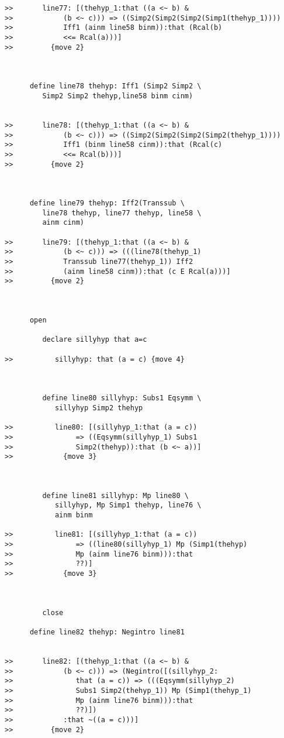 \documentclass[12pt]{article}
\begin{document}
\begin{verbatim}
>>       line77: [(thehyp_1:that ((a <~ b) &
>>            (b <~ c))) => ((Simp2(Simp2(Simp2(Simp1(thehyp_1))))
>>            Iff1 (ainm line58 binm)):that (Rcal(b)
>>            <<= Rcal(a)))]
>>         {move 2}



      define line78 thehyp: Iff1 (Simp2 Simp2 \
         Simp2 Simp2 thehyp,line58 binm cinm)


>>       line78: [(thehyp_1:that ((a <~ b) &
>>            (b <~ c))) => ((Simp2(Simp2(Simp2(Simp2(thehyp_1))))
>>            Iff1 (binm line58 cinm)):that (Rcal(c)
>>            <<= Rcal(b)))]
>>         {move 2}



      define line79 thehyp: Iff2(Transsub \
         line78 thehyp, line77 thehyp, line58 \
         ainm cinm)

>>       line79: [(thehyp_1:that ((a <~ b) &
>>            (b <~ c))) => (((line78(thehyp_1)
>>            Transsub line77(thehyp_1)) Iff2
>>            (ainm line58 cinm)):that (c E Rcal(a)))]
>>         {move 2}



      open

         declare sillyhyp that a=c

>>          sillyhyp: that (a = c) {move 4}



         define line80 sillyhyp: Subs1 Eqsymm \
            sillyhyp Simp2 thehyp

>>          line80: [(sillyhyp_1:that (a = c))
>>               => ((Eqsymm(sillyhyp_1) Subs1
>>               Simp2(thehyp)):that (b <~ a))]
>>            {move 3}



         define line81 sillyhyp: Mp line80 \
            sillyhyp, Mp Simp1 thehyp, line76 \
            ainm binm

>>          line81: [(sillyhyp_1:that (a = c))
>>               => ((line80(sillyhyp_1) Mp (Simp1(thehyp)
>>               Mp (ainm line76 binm))):that
>>               ??)]
>>            {move 3}



         close

      define line82 thehyp: Negintro line81


>>       line82: [(thehyp_1:that ((a <~ b) &
>>            (b <~ c))) => (Negintro([(sillyhyp_2:
>>               that (a = c)) => (((Eqsymm(sillyhyp_2)
>>               Subs1 Simp2(thehyp_1)) Mp (Simp1(thehyp_1)
>>               Mp (ainm line76 binm))):that
>>               ??)])
>>            :that ~((a = c)))]
>>         {move 2}




\end{verbatim}
\end{document}
